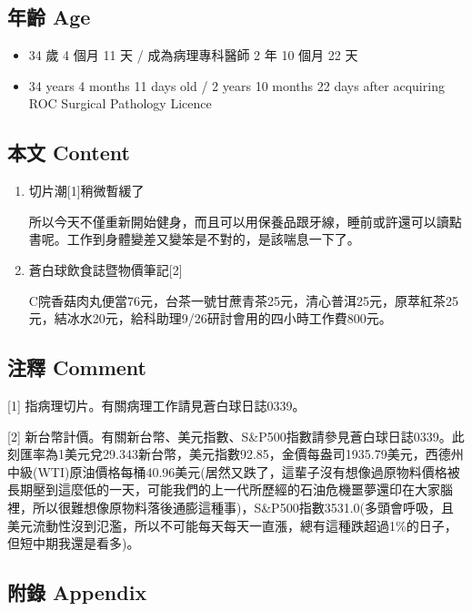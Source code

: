 \documentclass[
]{article}
\providecommand{\tightlist}{%
  \setlength{\itemsep}{0pt}\setlength{\parskip}{0pt}}
\begin{document}
\hypertarget{ux5e74ux9f61-age-2}{%
\subsection{年齡 Age}\label{ux5e74ux9f61-age-2}}

\begin{itemize}
\tightlist
\item
  34 歲 4 個月 11 天 / 成為病理專科醫師 2 年 10 個月 22 天
\item
  34 years 4 months 11 days old / 2 years 10 months 22 days after
  acquiring ROC Surgical Pathology Licence
\end{itemize}

\hypertarget{ux672cux6587-content-2}{%
\subsection{本文 Content}\label{ux672cux6587-content-2}}

\begin{enumerate}
\def\labelenumi{\arabic{enumi}.}
\item
  切片潮{[}1{]}稍微暫緩了

  所以今天不僅重新開始健身，而且可以用保養品跟牙線，睡前或許還可以讀點書呢。工作到身體變差又變笨是不對的，是該喘息一下了。
\item
  蒼白球飲食誌暨物價筆記{[}2{]}

  C院香菇肉丸便當76元，台茶一號甘蔗青茶25元，清心普洱25元，原萃紅茶25元，結冰水20元，給科助理9/26研討會用的四小時工作費800元。
\end{enumerate}

\hypertarget{ux6ce8ux91cb-comment-2}{%
\subsection{注釋 Comment}\label{ux6ce8ux91cb-comment-2}}

{[}1{]} 指病理切片。有關病理工作請見蒼白球日誌0339。

{[}2{]}
新台幣計價。有關新台幣、美元指數、S\&P500指數請參見蒼白球日誌0339。此刻匯率為1美元兌29.343新台幣，美元指數92.85，金價每盎司1935.79美元，西德州中級(WTI)原油價格每桶40.96美元(居然又跌了，這輩子沒有想像過原物料價格被長期壓到這麼低的一天，可能我們的上一代所歷經的石油危機噩夢還印在大家腦裡，所以很難想像原物料落後通膨這種事)，S\&P500指數3531.0(多頭會呼吸，且美元流動性沒到氾濫，所以不可能每天每天一直漲，總有這種跌超過1\%的日子，但短中期我還是看多)。

\hypertarget{ux9644ux9304-appendix-2}{%
\subsection{附錄 Appendix}\label{ux9644ux9304-appendix-2}}
\end{document}
